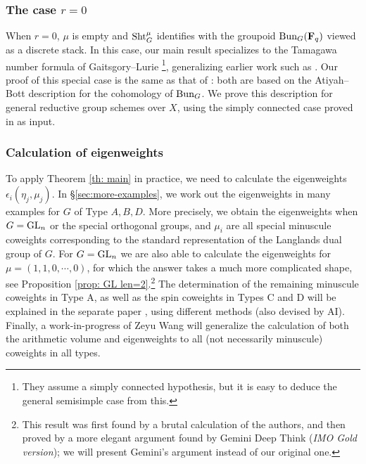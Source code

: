 \documentclass[reqno]{amsart}
\numberwithin{equation}{subsection}
\theoremstyle{definition}
\newcommand{\Bun}{\textup{Bun}}
\newcommand\Sht{\textup{Sht}}
\newcommand\GL{\textup{GL}}
\newcommand{\F}{\mathbf{F}}
\begin{document}
\subsubsection{The case $r=0$}
When $r = 0$, $\mu$ is empty and $\Sht_G^\mu$ identifies with the groupoid $\Bun_G(\F_q)$ viewed as a discrete stack. In this case, our main result specializes to the Tamagawa number formula of Gaitsgory--Lurie \cite{GL14}\footnote{They assume a simply connected hypothesis, but it is easy to deduce the general semisimple case from this.}, generalizing earlier work such as \cite{BD09}. Our proof of this special case is the same as that of \cite{GL14}: both are based on the Atiyah--Bott description for the cohomology of $\Bun_G$. We prove this description for general reductive group schemes over $X$, using the simply connected case proved in \cite{GL14} as input. 


\subsubsection{Calculation of eigenweights}

To apply Theorem \ref{th: main} in practice, we need to calculate the eigenweights $\epsilon_i(\eta_j, \mu_j)$. 
In \S\ref{sec:more-examples}, we work out the eigenweights in many examples for $G$ of Type $A,B,D$. More precisely, we obtain the eigenweights when $G=\GL_n$ or the special orthogonal 
groups, and $\mu_i$ are all special minuscule coweights corresponding to the standard representation  of the Langlands dual group of $G$. For $G=\GL_n$ we are also able to calculate the eigenweights for $\mu=(1,1,0,\cdots,0)$, for which the answer takes a much more complicated shape, see Proposition \ref{prop: GL len=2}.\footnote{This result was first found by a brutal calculation of the authors, and then proved by a more elegant argument found by Gemini Deep Think (\emph{IMO Gold version}); we will present Gemini's argument instead of our original one.} The determination of the remaining minuscule coweights in Type A, as well as the spin coweights in Types C and D  will be explained in the separate paper \cite{FAI}, using different methods (also devised by AI). Finally, a work-in-progress of Zeyu Wang will generalize the calculation of both the arithmetic volume and eigenweights to all (not necessarily minuscule) coweights in all types. 

 
\end{document}
